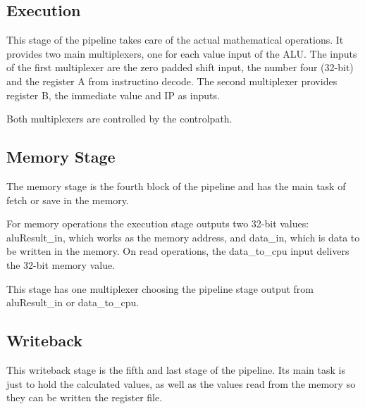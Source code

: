\subsection{Execution}
This stage of the pipeline takes care of the actual mathematical operations. It provides two main multiplexers, one for each value input of the ALU.
The inputs of the first multiplexer are the zero padded shift input, the number four (32-bit) and the register A from instructino decode. The second multiplexer provides register B, 
the immediate value and IP as inputs.

Both multiplexers are controlled by the controlpath.
\subsection{Memory Stage}
The memory stage is the fourth block of the pipeline and has the main task of fetch or save in the memory. 

For memory operations the execution stage outputs two 32-bit values: aluResult\_in, which works as the memory address, and data\_in, which is data to be written in the memory. 
On read operations, the data\_to\_cpu input delivers the 32-bit memory value.

This stage has one multiplexer choosing the pipeline stage output from aluResult\_in or data\_to\_cpu.
\subsection{Writeback}
This writeback stage is the fifth and last stage of the pipeline. Its main task is just to hold the calculated values, as well as the values read from the memory 
so they can be written the register file.
